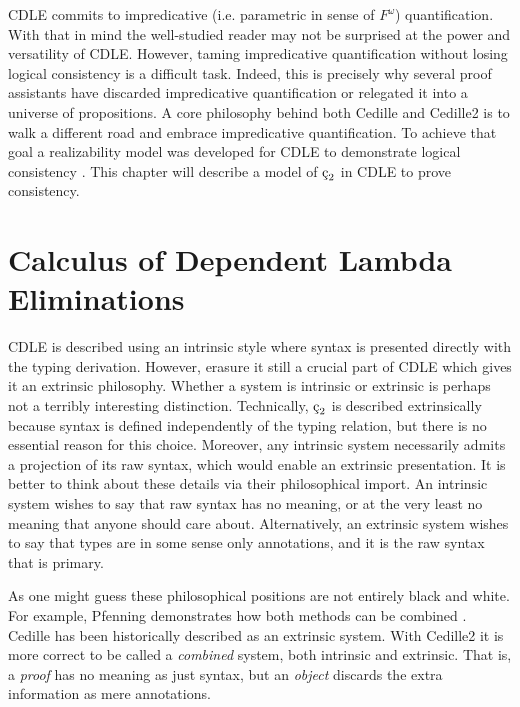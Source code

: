 CDLE commits to impredicative (i.e. parametric in sense of $F^\omega$) quantification.
With that in mind the well-studied reader may not be surprised at the power and versatility of CDLE.
However, taming impredicative quantification without losing logical consistency is a difficult task.
Indeed, this is precisely why several proof assistants have discarded impredicative quantification or relegated it into a universe of propositions.
A core philosophy behind both Cedille and Cedille2 is to walk a different road and embrace impredicative quantification.
To achieve that goal a realizability model was developed for CDLE to demonstrate logical consistency \cite{stump2021_cedillecore}.
This chapter will describe a model of $\ced$ in CDLE to prove consistency.

\section{Calculus of Dependent Lambda Eliminations}

CDLE is described using an intrinsic style where syntax is presented directly with the typing derivation.
However, erasure it still a crucial part of CDLE which gives it an extrinsic philosophy.
Whether a system is intrinsic or extrinsic is perhaps not a terribly interesting distinction.
Technically, $\ced$ is described extrinsically because syntax is defined independently of the typing relation, but there is no essential reason for this choice.
Moreover, any intrinsic system necessarily admits a projection of its raw syntax, which would enable an extrinsic presentation.
It is better to think about these details via their philosophical import.
An intrinsic system wishes to say that raw syntax has no meaning, or at the very least no meaning that anyone should care about.
Alternatively, an extrinsic system wishes to say that types are in some sense only annotations, and it is the raw syntax that is primary.




As one might guess these philosophical positions are not entirely black and white.
For example, Pfenning demonstrates how both methods can be combined \cite{pfenning2008church}.
Cedille has been historically described as an extrinsic system.
With Cedille2 it is more correct to be called a \textit{combined} system, both intrinsic and extrinsic.
That is, a \textit{proof} has no meaning as just syntax, but an \textit{object} discards the extra information as mere annotations.

